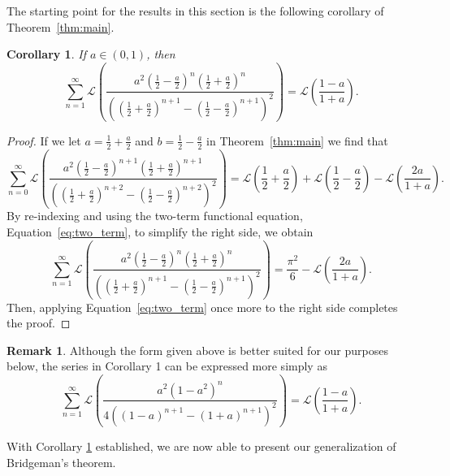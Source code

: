 \documentclass[10pt]{article}
\newtheorem{corollary}{Corollary}
\theoremstyle{definition}
\newtheorem{remark}{Remark}
\begin{document}
The starting point for the results in this section is the following corollary of Theorem~\ref{thm:main}.
\begin{corollary}\label{cor:main}
    If $a \in (0,1)$, then 
    \begin{equation*}
        \sum_{n=1}^{\infty}\mathcal{L}\left(\frac{a^2\left(\frac{1}{2}-\frac{a}{2}\right)^{n}\left(\frac{1}{2} + \frac{a}{2}\right)^{n}}{\left(\left(\frac{1}{2}+\frac{a}{2}\right)^{n+1}-\left(\frac{1}{2} - \frac{a}{2}\right)^{n+1}\right)^2}\right) = \mathcal{L}\left(\frac{1-a}{1+a}\right).
    \end{equation*}  
\end{corollary}
\begin{proof}
    If we let $a = \frac{1}{2}+\frac{a}{2}$ and $b = \frac{1}{2}-\frac{a}{2}$ in Theorem~\ref{thm:main} we find that
\begin{equation*}
    \sum_{n=0}^{\infty}\mathcal{L}\left(\frac{a^2(\frac{1}{2}-\frac{a}{2})^{n+1}(\frac{1}{2}+\frac{a}{2})^{n+1}}{((\frac{1}{2}+\frac{a}{2})^{n+2}-(\frac{1}{2}-\frac{a}{2})^{n+2})^2}\right) = \mathcal{L}\left(\frac{1}{2}+\frac{a}{2}\right) + \mathcal{L}\left(\frac{1}{2}-\frac{a}{2}\right) - \mathcal{L}\left(\frac{2a}{1+a}\right).
\end{equation*}
By re-indexing and using the two-term functional equation, Equation~\eqref{eq:two_term}, to simplify the right side, we obtain
\begin{equation*}
    \sum_{n=1}^{\infty}\mathcal{L}\left(\frac{a^2(\frac{1}{2}-\frac{a}{2})^{n}(\frac{1}{2}+\frac{a}{2})^{n}}{((\frac{1}{2}+\frac{a}{2})^{n+1}-(\frac{1}{2}-\frac{a}{2})^{n+1})^2}\right) = \frac{\pi^2}{6} - \mathcal{L}\left(\frac{2a}{1+a}\right).
\end{equation*}
Then, applying Equation~\eqref{eq:two_term} once more to the right side completes the proof.
\end{proof}
\begin{remark}
    Although the form given above is better suited for our purposes below, the series in Corollary 1 can be expressed more simply as
\begin{equation*}
    \sum_{n=1}^{\infty}\mathcal{L}\left(\frac{a^2\left(1-a^2\right)^{n}}{4\left(\left(1-a\right)^{n+1}-\left(1+a\right)^{n+1}\right)^2}\right) = \mathcal{L}\left(\frac{1-a}{1+a}\right).
\end{equation*}
\end{remark}
With Corollary \ref{cor:main} established, we are now able to present our generalization of Bridgeman's theorem.  
\end{document}

